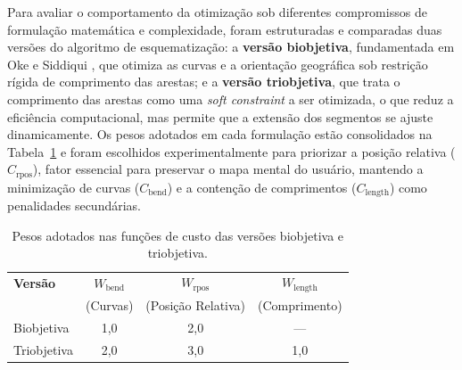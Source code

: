 \documentclass[cic,tc]{infufrgs}
\begin{document}
Para avaliar o comportamento da otimização sob diferentes compromissos de formulação matemática e complexidade, foram estruturadas e comparadas duas versões do algoritmo de esquematização: a \textbf{versão biobjetiva}, fundamentada em Oke e Siddiqui \cite{Oke}, que otimiza as curvas e a orientação geográfica sob restrição rígida de comprimento das arestas; e a \textbf{versão triobjetiva}, que trata o comprimento das arestas como uma \textit{soft constraint} a ser otimizada, o que reduz a eficiência computacional, mas permite que a extensão dos segmentos se ajuste dinamicamente. Os pesos adotados em cada formulação estão consolidados na Tabela~\ref{tab:pesos_versoes} e foram escolhidos experimentalmente para priorizar a posição relativa ($C_{\text{rpos}}$), fator essencial para preservar o mapa mental do usuário, mantendo a minimização de curvas ($C_{\text{bend}}$) e a contenção de comprimentos ($C_{\text{length}}$) como penalidades secundárias.

\begin{table}[H]
    \centering
    \caption{Pesos adotados nas funções de custo das versões biobjetiva e triobjetiva.}
    \label{tab:pesos_versoes}
    \begin{tabular}{lccc}
        \toprule
        \textbf{Versão} & \textbf{$W_{\text{bend}}$} & \textbf{$W_{\text{rpos}}$} & \textbf{$W_{\text{length}}$} \\
                        & (Curvas)                  & (Posição Relativa)                         & (Comprimento)                \\
        \midrule
        Biobjetiva      & 1,0 & 2,0 & --- \\
        Triobjetiva     & 2,0 & 3,0 & 1,0 \\
        \bottomrule
    \end{tabular}
\end{table}
\end{document}

